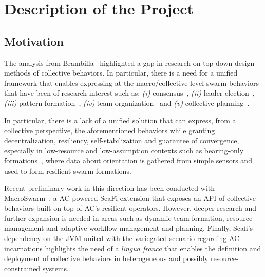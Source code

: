 \documentclass[12pt]{article}
\begin{document}
\section{Description of the Project}
\subsection{Motivation}
The analysis from Brambilla~\cite{brambilla2013swarm} highlighted a gap in research on top-down design methods of collective behaviors.
In particular, there is a need for a unified framework that enables expressing at the macro/collective level swarm behaviors that have
been of research interest such as:
\textit{(i)} consensus~\cite{valentini2017achieving}, \textit{(ii)} leader election~\cite{karpov2015leader}, \textit{(iii)} pattern formation~\cite{sahin2002swarm},
\textit{(iv)} team organization~\cite{nouyan2009teamwork} and \textit{(v)} collective planning~\cite{sampedro2016flexible}.

In particular, there is a lack of a unified solution that can express, from a collective perspective, the aforementioned behaviors while granting decentralization, 
resiliency, self-stabilization and guarantee of convergence, especially in low-resource and low-assumption contexts such as
bearing-only formations~\cite{zhao2021bearing}, where data about orientation is gathered from simple sensors and used to form resilient swarm formations.

Recent preliminary work in this direction has been conducted with MacroSwarm~\cite{aguzzi2023macroswarm}, a AC-powered ScaFi extension that exposes an API of collective
behaviors built on top of AC's resilient operators. However, deeper research and further expansion is needed in areas such as dynamic team formation, resource management and adaptive workflow management and planning.
Finally, Scafi's dependency on the JVM united with the variegated scenario regarding AC incarnations highlights the need of a \textit{lingua franca} that enables the definition and deployment
of collective behaviors in heterogeneous and possibly resource-constrained systems.
\end{document}
